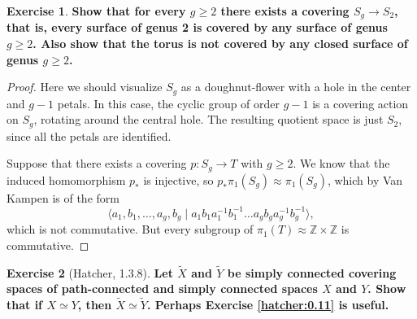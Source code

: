 \documentclass{book}
\theoremstyle{definition}
\newtheorem*{ejer}{Exercise}
\newcommand{\Z}{\mathbb{Z}}
\begin{document}
\begin{ejer}
\textbf{Show that for every $g\geq2$ there exists a covering
$S_g\to S_2$, that is, every surface of genus 2 is covered
by any surface of genus $g\geq2$. Also show that the torus is
not covered by any closed surface of genus $g\geq2$.}
\end{ejer}

\begin{proof}
Here we should visualize $S_g$ as a doughnut-flower with a
hole in the center and $g-1$ petals. In this case, the cyclic
group of order $g-1$ is a covering action on $S_g$, rotating
around the central hole. The resulting quotient space is just
$S_2$, since all the petals are identified.

Suppose that there exists a covering $p:S_g\to T$ with
$g\geq2$. We know that the induced homomorphism $p_*$ is
injective, so $p_*\pi_1(S_g)\approx\pi_1(S_g)$, which by Van
Kampen is of the form
$$
\langle a_1,b_1,\ldots,a_g,b_g
\mid
 a_1b_1a_1^{-1}b_1^{-1}\ldots
 a_gb_ga_g^{-1}b_g^{-1}\rangle,
$$
which is not commutative. But every subgroup of
$\pi_1(T)\approx\Z\times\Z$ is commutative.
\end{proof}

\begin{ejer}[Hatcher, 1.3.8]
\textbf{Let $\tilde X$ and $\tilde Y$ be simply connected
covering spaces of path-connected and simply connected
spaces $X$ and $Y$. Show that if $X\simeq Y$, then
$\tilde X\simeq\tilde Y$. Perhaps Exercise
\ref{hatcher:0.11} is useful.}
\end{ejer}
\end{document}
